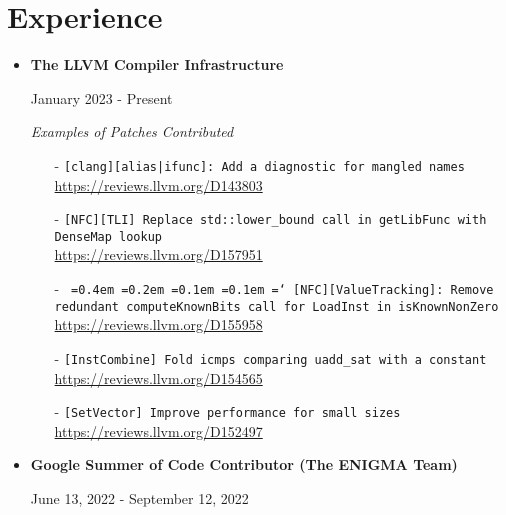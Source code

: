 \documentclass[12pt]{article}
\newcommand*\justify{%
  \fontdimen2\font=0.4em%
  \fontdimen3\font=0.2em%
  \fontdimen4\font=0.1em%
  \fontdimen7\font=0.1em%
  \hyphenchar\font=`\-%
}
\newcommand{\primarycolor}{red}
\newcommand{\mysection}[1]{\section{#1}\vspace{-1.2ex}}
\begin{document}
    \mysection{Experience}
    {
        \begin{itemize}
            \item
                \textbf{The LLVM Compiler Infrastructure}

                {\color{\primarycolor}January 2023 - Present}

                \textit{Examples of Patches Contributed}
                \vspace{-1ex}
                \begin{itemize}[itemsep=1ex, leftmargin=3.5ex]
                    \item[-]
                        {\texttt{[clang][alias|ifunc]: Add a diagnostic for mangled names}}\\
                        \url{https://reviews.llvm.org/D143803}
                    \item[-]
                        {\texttt{[NFC][TLI] Replace std::lower\_bound call in getLibFunc with DenseMap lookup}}\\
                        \url{https://reviews.llvm.org/D157951}
                    \item[-]
                        {\texttt{\justify{[NFC][ValueTracking]: Remove redundant computeKnownBits call for LoadInst in isKnownNonZero}}}\\
                        \url{https://reviews.llvm.org/D155958}
                    \item[-]
                        {\texttt{[InstCombine] Fold icmps comparing uadd\_sat with a constant}}\\
                        \url{https://reviews.llvm.org/D154565}
                    \item[-]
                        {\texttt{[SetVector] Improve performance for small sizes}}\\
                        \url{https://reviews.llvm.org/D152497}
                \end{itemize}
            \item
                \textbf{Google Summer of Code Contributor (The ENIGMA Team)}

                {\color{\primarycolor}June 13, 2022 - September 12, 2022}


\end{itemize}}
\end{document}
